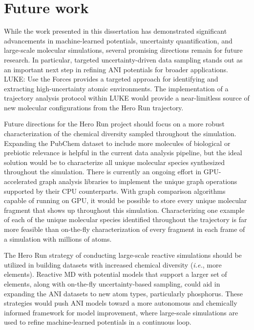 \chapter{Future work} 
\label{future_work}

While the work presented in this dissertation has demonstrated significant advancements in machine-learned potentials, uncertainty quantification, and large-scale molecular simulations, several promising directions remain for future research.
In particular, targeted uncertainty-driven data sampling stands out as an important next step in refining ANI potentials for broader applications.
LUKE: Use the Forces provides a targeted approach for identifying and extracting high-uncertainty atomic environments. 
The implementation of a trajectory analysis protocol within LUKE would provide a near-limitless source of new molecular configurations from the Hero Run trajectory. 

Future directions for the Hero Run project should focus on a more robust characterization of the chemical diversity sampled throughout the simulation.
Expanding the PubChem dataset to include more molecules of biological or prebiotic relevance is helpful in the current data analysis pipeline, but the ideal solution would be to characterize all unique molecular species synthesized throughout the simulation.
There is currently an ongoing effort in GPU-accelerated graph analysis libraries to implement the unique graph operations supported by their CPU counterparts. 
With graph comparison algorithms capable of running on GPU, it would be possible to store every unique molecular fragment that shows up throughout this simulation.
Characterizing one example of each of the unique molecular species identified throughout the trajectory is far more feasible than on-the-fly characterization of every fragment in each frame of a simulation with millions of atoms. 

The Hero Run strategy of conducting large-scale reactive simulations should be utilized in building datasets with increased chemical diversity (\textit{i.e.}, more elements).
Reactive MD with potential models that support a larger set of elements, along with on-the-fly uncertainty-based sampling, could aid in expanding the ANI datasets to new atom types, particularly phosphorus.
These strategies would push ANI models toward a more autonomous and chemically informed framework for model improvement, where large-scale simulations are used to refine machine-learned potentials in a continuous loop. 
